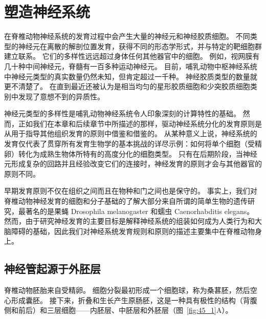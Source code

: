 \chapter{塑造神经系统} \label{chap:chap45}

在脊椎动物神经系统的发育过程中会产生大量的神经元和神经胶质细胞。
不同类型的神经元在离散的解剖位置发育，获得不同的形态学形式，并与特定的靶细胞群建立联系。
它们的多样性远远超过身体任何其他器官中的细胞。
例如，视网膜有几十种中间神经元，脊髓有一百多种运动神经元。
目前，哺乳动物中枢神经系统中神经元类型的真实数量仍然未知，但肯定超过一千种。
神经胶质类型的数量就更不清楚了。
在直到最近还被认为是相当均匀的星形胶质细胞和少突胶质细胞类别中发现了意想不到的异质性。


神经元类型的多样性是哺乳动物神经系统令人印象深刻的计算特性的基础。
然而，正如我们在本章和后续章节中所描述的那样，驱动神经系统分化的发育原则是从用于指导其他组织发育的原则中借鉴和借鉴的。
从某种意义上说，神经系统的发育仅代表了贯穿所有发育生物学的基本挑战的详尽示例：如何将单个细胞（受精卵）转化为成熟生物体所特有的高度分化的细胞类型。
只有在后期阶段，当神经元形成复杂的回路并且经验改变它们的连接时，神经发育的原则才会与其他器官的原则不同。


早期发育原则不仅在组织之间而且在物种和门之间也是保守的。
事实上，我们对脊椎动物神经发育的细胞和分子基础的了解大部分来自所谓的简单生物的遗传研究，最著名的是果蝇 Drosophila melanogaster 和蠕虫 Caenorhabditis elegans。
然而，由于研究神经发育的主要目标是解释神经系统的组装如何成为人类行为和大脑障碍的基础，因此我们对神经系统发育规则和原则的描述主要集中在脊椎动物身上。



\section{神经管起源于外胚层}

脊椎动物胚胎来自受精卵。
细胞分裂最初形成一个细胞球，称为桑葚胚，然后空心形成囊胚。
接下来，折叠和生长产生原肠胚，这是一种具有极性的结构（背腹侧和前后）和三层细胞——内胚层、中胚层和外胚层（图~\ref{fig:45_1}A）。


